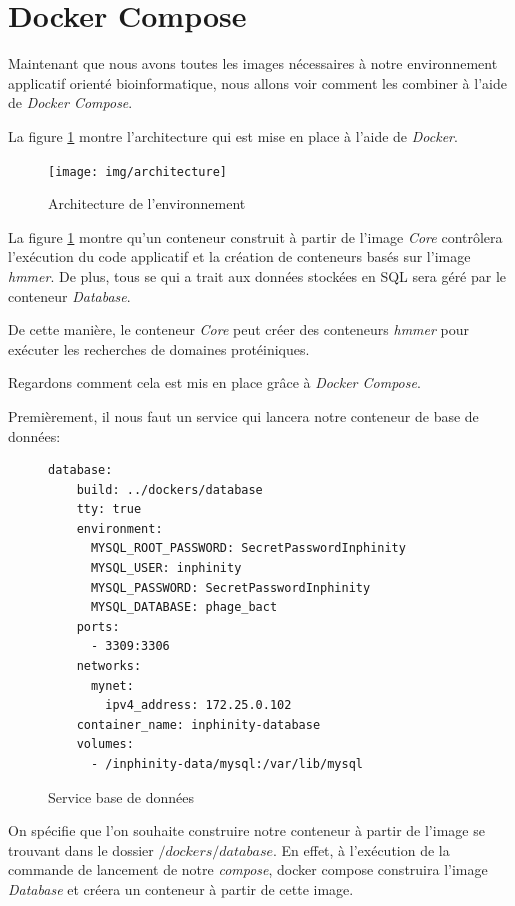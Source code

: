 \section{Docker Compose}
Maintenant que nous avons toutes les images nécessaires à notre environnement applicatif orienté bioinformatique, nous allons voir comment les combiner à l'aide de \emph{Docker Compose}.

La figure \ref{fig:architecture} montre l'architecture qui est mise en place à l'aide de \emph{Docker}.

\begin{figure}[H] 
\centering 
\texttt{[image: img/architecture]} 
\caption[architecture]{Architecture de l'environnement}
\label{fig:architecture} 
\end{figure}

La figure \ref{fig:architecture} montre qu'un conteneur construit à partir de l'image \emph{Core} contrôlera l'exécution du code applicatif et la création de conteneurs basés sur l'image \emph{hmmer}. De plus, tous se qui a trait aux données stockées en SQL sera géré par le conteneur \emph{Database}.

De cette manière, le conteneur \emph{Core} peut créer des conteneurs \emph{hmmer} pour exécuter les recherches de domaines protéiniques.

Regardons comment cela est mis en place grâce à \emph{Docker Compose}. 

Premièrement, il nous faut un service qui lancera notre conteneur de base de données:

\begin{figure}[H] 
\centering 
\begin{lstlisting}[frame=single]
database:
    build: ../dockers/database
    tty: true
    environment:
      MYSQL_ROOT_PASSWORD: SecretPasswordInphinity
      MYSQL_USER: inphinity
      MYSQL_PASSWORD: SecretPasswordInphinity
      MYSQL_DATABASE: phage_bact
    ports:
      - 3309:3306
    networks:
      mynet:
        ipv4_address: 172.25.0.102
    container_name: inphinity-database
    volumes:
      - /inphinity-data/mysql:/var/lib/mysql
\end{lstlisting}
\caption[Service base de données]{Service base de données}
\label{fig:serviceDb} 
\end{figure}

On spécifie que l'on souhaite construire notre conteneur à partir de l'image se trouvant dans le dossier \emph{$/dockers/database$}. En effet, à l'exécution de la commande de lancement de notre \emph{compose}, docker compose construira l'image \emph{Database} et créera un conteneur à partir de cette image.

